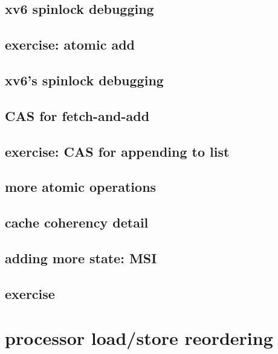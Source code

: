 \subsection{xv6 spinlock debugging}


\subsection{exercise: atomic add}


\subsection{xv6's spinlock debugging}



\subsection{CAS for fetch-and-add}


\subsection{exercise: CAS for appending to list}



\subsection{more atomic operations}



\subsection{cache coherency detail}
\subsection{adding more state: MSI}


\subsection{exercise}



\section{processor load/store reordering}



